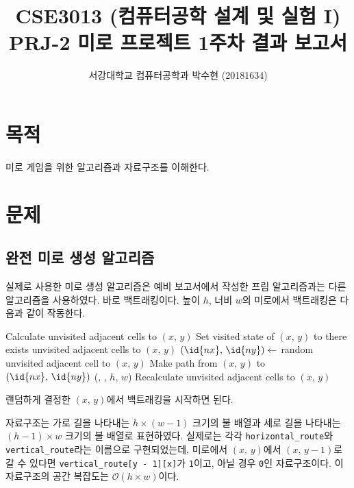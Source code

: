 
	


\title{CSE3013 (컴퓨터공학 설계 및 실험 I) \space \newline PRJ-2 미로 프로젝트 1주차 결과 보고서}
\author{서강대학교 컴퓨터공학과 박수현 (20181634)}
\maketitle

\section{목적}
미로 게임을 위한 알고리즘과 자료구조를 이해한다.

\section{문제}
\subsection{완전 미로 생성 알고리즘}

실제로 사용한 미로 생성 알고리즘은 예비 보고서에서 작성한 프림 알고리즘과는 다른 알고리즘을 사용하였다. 바로 백트래킹이다.
높이 $h$, 너비 $w$의 미로에서 백트래킹은 다음과 같이 작동한다.

\begin{codebox}
\li Calculate unvisited adjacent cells to $(x,\,y)$
\li Set visited state of $(x,\,y)$ to 
\li \While there exists unvisited adjacent cells to $(x,\,y)$ \Do
\li     $(\id{nx},\,\id{ny}) \gets$ random unvisited adjacent cell to $(x,\,y)$
\li     Make path from $(x,\,y)$ to $(\id{nx},\,\id{ny})$
\li     {}(, , $h$, $w$)
\li     Recalculate unvisited adjacent cells to $(x,\,y)$
    \End
\end{codebox}

랜덤하게 결정한 $(x,\,y)$에서 백트래킹을 시작하면 된다.

자료구조는 가로 길을 나타내는 $h \times \left(w - 1\right)$ 크기의 불 배열과 세로 길을 나타내는 $\left(h - 1\right) \times w$ 크기의
불 배열로 표현하였다. 실제로는 각각 \texttt{horizontal_route}와 \texttt{vertical_route}라는 이름으로 구현되었는데,
미로에서 $(x,\,y)$에서 $(x,\,y-1)$로 갈 수 있다면 \texttt{vertical_route[y - 1][x]}가 \texttt{1}이고, 아닐 경우 \texttt{0}인 자료구조이다.
이 자료구조의 공간 복잡도는 $\mathcal{O}\left(h\times w\right)$이다.

